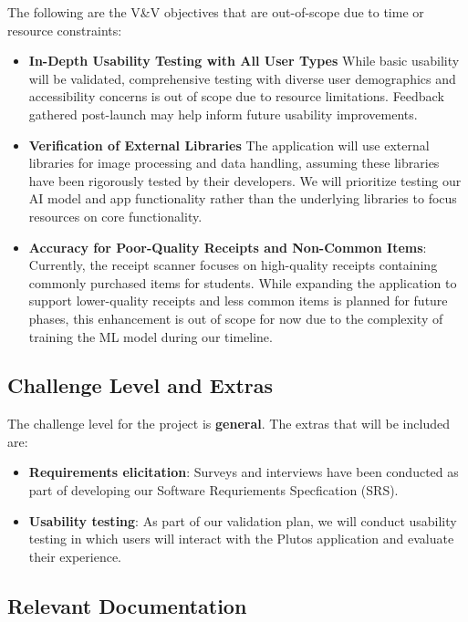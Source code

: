 \documentclass[12pt, titlepage]{article}
\begin{document}
The following are the V\&V objectives that are out-of-scope due to time or
resource constraints:
\begin{itemize}
	\item \textbf{In-Depth Usability Testing with All User Types} While basic
usability will be validated, comprehensive testing with diverse user
demographics and accessibility concerns is out of scope due to resource
limitations. Feedback gathered post-launch may help inform future usability
improvements. 
	\item \textbf{Verification of External Libraries} The application will use
external libraries for image processing and data handling, assuming these
libraries have been rigorously tested by their developers. We will prioritize
testing our AI model and app functionality rather than the underlying libraries
to focus resources on core functionality. 
	\item \textbf{Accuracy for Poor-Quality Receipts and Non-Common Items}:
Currently, the receipt scanner focuses on high-quality receipts containing
commonly purchased items for students. While expanding the application to
support lower-quality receipts and less common items is planned for future
phases, this enhancement is out of scope for now due to the complexity of
training the ML model during our timeline.

\end{itemize}



\subsection{Challenge Level and Extras}

The challenge level for the project is \textbf{general}. The extras that will be included are: 
\begin{itemize}
	\item \textbf{Requirements elicitation}: Surveys and interviews have been conducted
	as part of developing our Software Requriements Specfication (SRS).
	\item \textbf{Usability testing}: As part of our validation plan, we will conduct
	usability testing in which users will interact with the Plutos application and
	evaluate their experience.
\end{itemize}

\subsection{Relevant Documentation}
\end{document}
